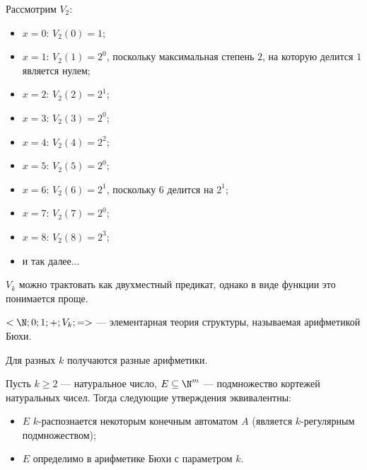     \begin{Example}
        Рассмотрим $V_2$: 
        \begin{itemize}
            \item $x = 0$: $V_2(0) = 1$;
            \item $x = 1$: $V_2(1) = 2^0$, поскольку максимальная степень $2$, на которую делится $1$ является нулем;
            \item $x = 2$: $V_2(2) = 2^1$;
            \item $x = 3$: $V_2(3) = 2^0$;
            \item $x = 4$: $V_2(4) = 2^2$;
            \item $x = 5$: $V_2(5) = 2^0$;
            \item $x = 6$: $V_2(6) = 2^1$, поскольку $6$ делится на $2^1$;
            \item $x = 7$: $V_2(7) = 2^0$;
            \item $x = 8$: $V_2(8) = 2^3$;
            \item и так далее...
        \end{itemize}
    \end{Example}
    
    \begin{Rem}
        $V_k$ можно трактовать как двухместный предикат, однако в виде функции это понимается проще.
    \end{Rem}
    
    \begin{Def}
        $<\N; 0; 1; +; V_k; =>$ --- элементарная теория структуры, называемая арифметикой Бюхи.
    \end{Def}
    
    \begin{Rem}
        Для разных $k$ получаются разные арифметики.
    \end{Rem}
    
    \begin{Thm}
        Пусть $k \geq 2$ --- натуральное число, $E \subseteq \N^m$ --- подмножество кортежей натуральных чисел. Тогда следующие утверждения эквивалентны:
        \begin{itemize}
            \item $E$ $k$-распознается некоторым конечным автоматом $A$ (является $k$-регулярным подмножеством);
            \item $E$ определимо в арифметике Бюхи с параметром $k$.
        \end{itemize}
    \end{Thm}

